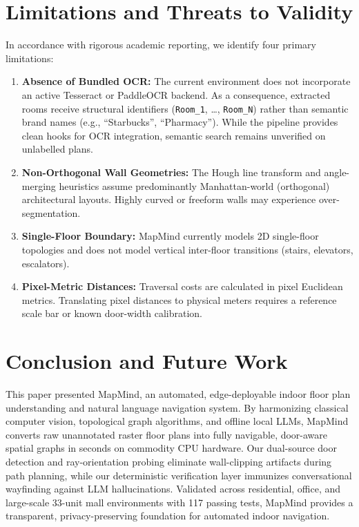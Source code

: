 \documentclass[conference]{IEEEtran}
\begin{document}
\section{Limitations and Threats to Validity}
In accordance with rigorous academic reporting, we identify four primary limitations:
\begin{enumerate}
    \item \textbf{Absence of Bundled OCR:} The current environment does not incorporate an active Tesseract or PaddleOCR backend. As a consequence, extracted rooms receive structural identifiers (\texttt{Room\_1}, \dots, \texttt{Room\_N}) rather than semantic brand names (e.g., ``Starbucks'', ``Pharmacy''). While the pipeline provides clean hooks for OCR integration, semantic search remains unverified on unlabelled plans.
    \item \textbf{Non-Orthogonal Wall Geometries:} The Hough line transform and angle-merging heuristics assume predominantly Manhattan-world (orthogonal) architectural layouts. Highly curved or freeform walls may experience over-segmentation.
    \item \textbf{Single-Floor Boundary:} MapMind currently models 2D single-floor topologies and does not model vertical inter-floor transitions (stairs, elevators, escalators).
    \item \textbf{Pixel-Metric Distances:} Traversal costs are calculated in pixel Euclidean metrics. Translating pixel distances to physical meters requires a reference scale bar or known door-width calibration.
\end{enumerate}

\section{Conclusion and Future Work}
This paper presented MapMind, an automated, edge-deployable indoor floor plan understanding and natural language navigation system. By harmonizing classical computer vision, topological graph algorithms, and offline local LLMs, MapMind converts raw unannotated raster floor plans into fully navigable, door-aware spatial graphs in seconds on commodity CPU hardware. Our dual-source door detection and ray-orientation probing eliminate wall-clipping artifacts during path planning, while our deterministic verification layer immunizes conversational wayfinding against LLM hallucinations. Validated across residential, office, and large-scale 33-unit mall environments with 117 passing tests, MapMind provides a transparent, privacy-preserving foundation for automated indoor navigation.
\end{document}
